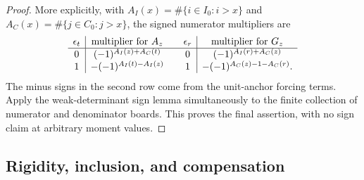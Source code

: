\documentclass[11pt,a4paper]{amsart}
\numberwithin{equation}{section}
\theoremstyle{plain}
\theoremstyle{definition}
\begin{document}
\begin{proof}
More explicitly, with \(A_I(x)=\#\{i\in I_0:i>x\}\) and
\(A_C(x)=\#\{j\in C_0:j>x\}\), the signed numerator multipliers are
\begin{equation}\label{eq:contact-cramer-signs}
\begin{array}{c|c@{\qquad}c|c}
 \epsilon_t&\text{multiplier for }A_z&\epsilon_r&
       \text{multiplier for }G_z\\ \hline
 0&(-1)^{A_I(z)+A_C(t)}&0&(-1)^{A_I(r)+A_C(z)}\\
 1&-(-1)^{A_I(t)-A_I(z)}&1&-(-1)^{A_C(z)-1-A_C(r)}.
\end{array}
\end{equation}
The minus signs in the second row come from the unit-anchor forcing
terms.  Apply the weak-determinant sign lemma simultaneously to the finite
collection of numerator and denominator boards.  This proves the final
assertion, with no sign claim at arbitrary moment values.
\end{proof}

\subsection{Rigidity, inclusion, and compensation}
\end{document}
